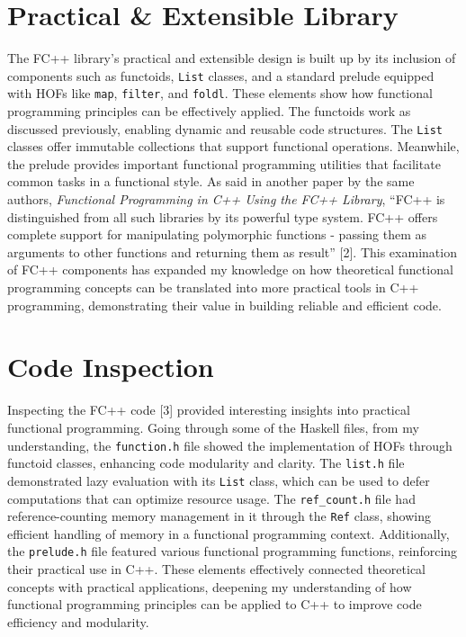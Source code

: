 \documentclass[12pt]{article}
\begin{document}
\section{Practical \& Extensible Library}
The FC++ library's practical and extensible design is built up by its inclusion of components such as functoids, \texttt{List} classes, and a standard prelude equipped with HOFs like \texttt{map}, \texttt{filter}, and \texttt{foldl}. These elements show how functional programming principles can be effectively applied. The functoids work as discussed previously, enabling dynamic and reusable code structures. The \texttt{List} classes offer immutable collections that support functional operations. Meanwhile, the prelude provides important functional programming utilities that facilitate common tasks in a functional style. As said in another paper by the same authors, \textit{Functional Programming in C++ Using the FC++ Library}, ``FC++ is distinguished from all such libraries by its powerful type system. FC++ offers complete support for manipulating polymorphic functions - passing them as arguments to other functions and returning them as result'' [2]. This examination of FC++ components has expanded my knowledge on how theoretical functional programming concepts can be translated into more practical tools in C++ programming, demonstrating their value in building reliable and efficient code.

\section{Code Inspection}
Inspecting the FC++ code [3] provided interesting insights into practical functional programming. Going through some of the Haskell files, from my understanding, the \texttt{function.h} file showed the implementation of HOFs through functoid classes, enhancing code modularity and clarity. The \texttt{list.h} file demonstrated lazy evaluation with its \texttt{List} class, which can be used to defer computations that can optimize resource usage. The \texttt{ref\_count.h} file had reference-counting memory management in it through the \texttt{Ref} class, showing efficient handling of memory in a functional programming context. Additionally, the \texttt{prelude.h} file featured various functional programming functions, reinforcing their practical use in C++. These elements effectively connected theoretical concepts with practical applications, deepening my understanding of how functional programming principles can be applied to C++ to improve code efficiency and modularity.
\end{document}
